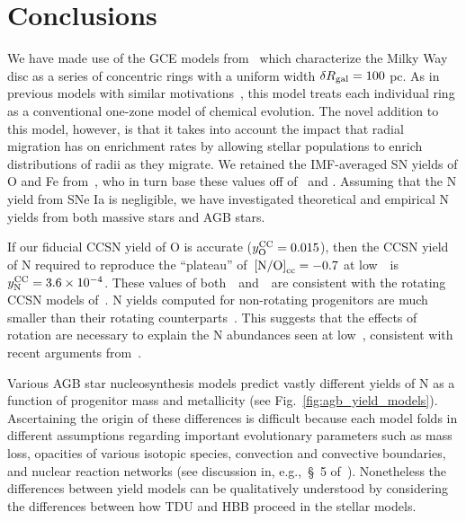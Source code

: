 \documentclass[ms.tex]{subfiles}
\begin{document}
\section{Conclusions}
\label{sec:conclusions}

We have made use of the GCE models from~\citet{Johnson2021} which characterize
the Milky Way disc as a series of concentric rings with a uniform width
$\delta R_\text{gal} = 100$ pc.
As in previous models with similar motivations~\citep{Matteucci1989,
Wyse1989, Prantzos1995, Schoenrich2009, Minchev2013, Minchev2014, Minchev2017,
Sharma2021}, this model treats each individual ring as a conventional one-zone
model of chemical evolution.
The novel addition to this model, however, is that it takes into account the
impact that radial migration has on enrichment rates by allowing stellar
populations to enrich distributions of radii as they migrate.
We retained the IMF-averaged SN yields of O and Fe from~\citet{Johnson2021},
who in turn base these values off of~\citet{Weinberg2017} and
\citet{Johnson2020}.
Assuming that the N yield from SNe Ia is negligible, we have investigated
theoretical and empirical N yields from both massive stars and AGB stars.
\par
If our fiducial CCSN yield of O is accurate ($y_\text{O}^\text{CC} = 0.015$), then the CCSN
yield of N required to reproduce the ``plateau'' of~$\text{[N/O]}_\text{cc} = -0.7$ at
low~\oh~is~$y_\text{N}^\text{CC} = 3.6\times10^{-4}$.
These values of both~~and~\no\subcc~are consistent with the rotating
CCSN models of~\citet{Limongi2018}.
N yields computed for non-rotating progenitors are much smaller than their
rotating counterparts~\citep[see Fig.~\ref{fig:n_cc_yields};][]{Woosley1995,
Nomoto2013, Sukhbold2016, Limongi2018}.
This suggests that the effects of rotation are necessary to explain the N
abundances seen at low~\oh, consistent with recent arguments
from~\citet{Grisoni2021}.
\par
Various AGB star nucleosynthesis models predict vastly different yields of N
as a function of progenitor mass and metallicity (see
Fig.~\ref{fig:agb_yield_models}).
Ascertaining the origin of these differences is difficult because each model
folds in different assumptions regarding important evolutionary parameters such
as mass loss, opacities of various isotopic species, convection and convective
boundaries, and nuclear reaction networks (see discussion in, e.g.,~\S~5
of~\citealp{Karakas2016}).
Nonetheless the differences between yield models can be qualitatively
understood by considering the differences between how TDU and HBB proceed in
the stellar models.
\end{document}
